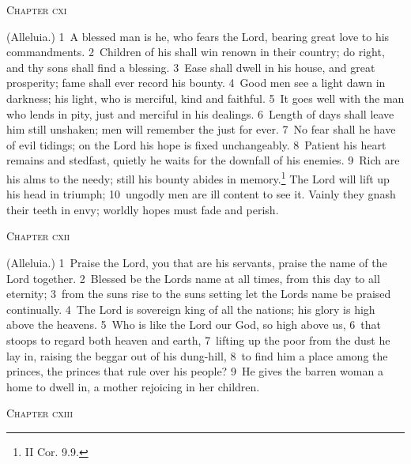 \documentclass[10pt]{book} %
\begin{document}
\begin{large}\begin{center}\textsc{Chapter cxi}\end{center}\end{large}
(Alleluia.)
\textcolor{benred8}{1}~A blessed man is he, who fears the Lord, bearing great love to his commandments. \textcolor{benred8}{2}~Children of his shall win renown in their country; do right, and thy sons shall find a blessing. \textcolor{benred8}{3}~Ease shall dwell in his house, and great prosperity; fame shall ever record his bounty. \textcolor{benred8}{4}~Good men see a light dawn in darkness; his light, who is merciful, kind and faithful. \textcolor{benred8}{5}~It goes well with the man who lends in pity, just and merciful in his dealings. \textcolor{benred8}{6}~Length of days shall leave him still unshaken; men will remember the just for ever. \textcolor{benred8}{7}~No fear shall he have of evil tidings; on the Lord his hope is fixed unchangeably. \textcolor{benred8}{8}~Patient his heart remains and stedfast, quietly he waits for the downfall of his enemies. \textcolor{benred8}{9}~Rich are his alms to the needy; still his bounty abides in memory.\footnote[1]{II Cor. 9.9.} The Lord will lift up his head in triumph; \textcolor{benred8}{10}~ungodly men are ill content to see it. Vainly they gnash their teeth in envy; worldly hopes must fade and perish.
\begin{large}\begin{center}\textsc{Chapter cxii}\end{center}\end{large}
(Alleluia.)
\textcolor{benred8}{1}~Praise the Lord, you that are his servants, praise the name of the Lord together. \textcolor{benred8}{2}~Blessed be the Lord\textquotesingle s name at all times, from this day to all eternity; \textcolor{benred8}{3}~from the sun\textquotesingle s rise to the sun\textquotesingle s setting let the Lord\textquotesingle s name be praised continually. \textcolor{benred8}{4}~The Lord is sovereign king of all the nations; his glory is high above the heavens. \textcolor{benred8}{5}~Who is like the Lord our God, so high above us, \textcolor{benred8}{6}~that stoops to regard both heaven and earth, \textcolor{benred8}{7}~lifting up the poor from the dust he lay in, raising the beggar out of his dung-hill, \textcolor{benred8}{8}~to find him a place among the princes, the princes that rule over his people? \textcolor{benred8}{9}~He gives the barren woman a home to dwell in, a mother rejoicing in her children.
\begin{large}\begin{center}\textsc{Chapter cxiii}\end{center}\end{large}
\end{document}
